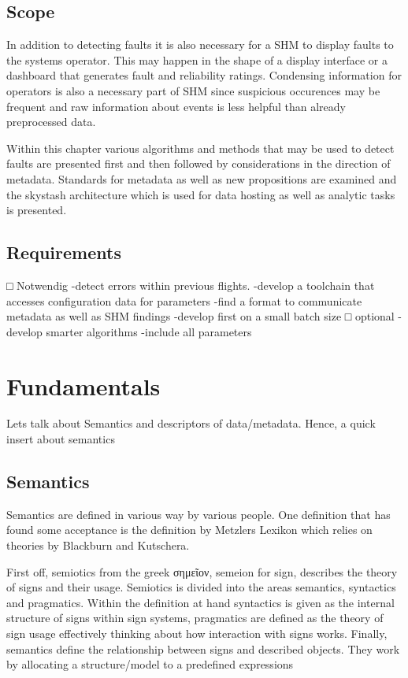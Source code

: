 \subsection{Scope}
In addition to detecting faults it is also necessary for a SHM to display faults to the systems operator. This may happen in the shape of a display interface or a dashboard that generates fault and reliability ratings. Condensing information for operators is also a necessary part of SHM since suspicious occurences may be frequent and raw information about events is less helpful than already preprocessed data.


Within this chapter various algorithms and methods that may be used to detect faults are presented first and then followed by considerations in the direction of metadata. Standards for metadata as well as new propositions are examined and the skystash architecture which is used for data hosting as well as analytic tasks is presented.


\subsection{Requirements}
□ Notwendig
-detect errors within previous flights.
-develop a toolchain that accesses configuration data for parameters
-find a format to communicate metadata as well as SHM findings
-develop first on a small batch size
□ optional
-develop smarter algorithms
-include all parameters

\section{Fundamentals}

Lets talk about Semantics and descriptors of data/metadata. Hence, a quick insert about semantics

\subsection{Semantics}
Semantics are defined in various way by various people. One definition that has found some acceptance is the definition by Metzlers Lexikon which relies on theories by Blackburn and Kutschera. \cite{shoemaker_spreading_1987,kutschera_sprachphilosophie_1975}


First off, semiotics from the greek σημεῖον, semeion for sign, describes the theory of signs and their usage. Semiotics is divided into the areas semantics, syntactics and pragmatics. Within the definition at hand syntactics is given as the internal structure of signs within sign systems, pragmatics are defined as the theory of sign usage effectively thinking about how interaction with signs works.
Finally, semantics define the relationship between signs and described objects. They work by allocating a structure/model to a predefined expressions

